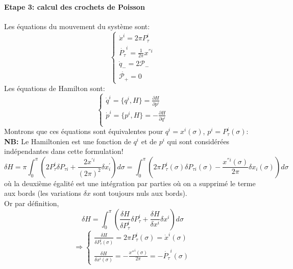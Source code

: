 \documentclass[a4paper,12pt]{article}
\def\CP{\mathcal{P}}
\def\pt{P_\tau}
\begin{document}
\paragraph*{Etape 3: calcul des crochets de Poisson}
Les équations du mouvement du système sont:
\begin{equation}
	\left\lbrace
    \begin{aligned}
   		\dot{x}^i=2\pi\pt^i\\
		\dot{\pt}^i=\frac{1}{2\pi}x^{'' i}\\
		\dot{q}_-=2\CP_-\\
		\dot{\CP_+}=0
     \end{aligned}
     \right.
\end{equation}
Les équations de Hamilton sont:
\begin{equation}
	\left\lbrace
    \begin{aligned}
		\dot{q}^i=\{q^i,H\}=\frac{\partial H}{\partial p^i}\\
		\dot{p}^i=\{p^i,H\}=-\frac{\partial H}{\partial q^i}\\
     \end{aligned}
     \right.
\end{equation}
 Montrons que ces équations sont équivalentes pour $q^i=x^i(\sigma)$, $p^i=\pt^i(\sigma)$:\\
\textbf{NB:} Le Hamiltonien est une fonction de $q^i$ et de $p^i$ qui sont considérées indépendantes dans cette formulation! \\
\begin{equation*}
\delta H = \pi\int_0^\pi\left(2\pt^i \delta P_{\tau i} +\frac{2x^{'i}}{(2\pi)^2}\delta x^{'}_{i}\right) d\sigma=\int_0^\pi \left( 2\pi\pt^i(\sigma) \delta P_{\tau i}(\sigma) -\frac{x^{''i}(\sigma)}{2\pi}\delta x_{i}(\sigma)\right)  d\sigma 
\end{equation*}
où la deuxième égalité est une intégration par parties où on a supprimé le terme aux bords (les variations $\delta x$ sont toujours nuls aux bords).\\
Or par définition,
\begin{equation*}
\delta H=\int_0^\pi\left( \frac{\delta H}{\delta \pt^i}\delta \pt^i + \frac{\delta H}{\delta x^i}\delta x^i\right)d \sigma
\end{equation*}
\begin{equation*}
\Rightarrow
\left\lbrace
\begin{aligned}
\frac{\delta H}{\delta \pt^i(\sigma)}=2\pi \pt^i (\sigma)= \dot{x}^i(\sigma)\\
\frac{\delta H}{\delta x^i(\sigma)}= -\frac{x''^i(\sigma)}{2\pi}=-\dot{\pt}^i(\sigma)
\end{aligned}
\right.
\end{equation*}
\end{document}
